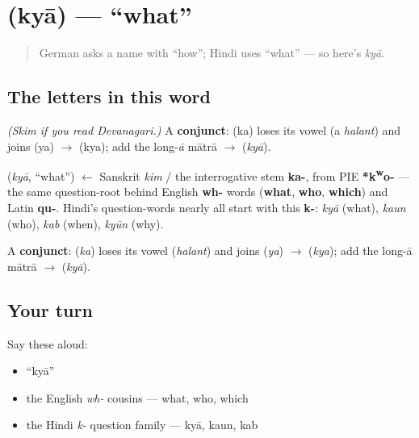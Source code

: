 \section[\texorpdfstring{\hi{क्या} (kyā)}{क्या (kyā)}]{ (kyā) — \textquotedblleft{}what\textquotedblright{}}

\label{lesson:HI-C02-kya}



\begin{quote}
German asks a name with \textquotedblleft{}how\textquotedblright{}; Hindi uses \textquotedblleft{}what\textquotedblright{} — so here's \emph{kyā}.
\end{quote}

\subsection*{The letters in this word}
\emph{(Skim if you read Devanagari.)} A \textbf{conjunct}: \textbf{} (ka) loses its vowel (a \emph{halant}) and joins \textbf{} (ya) $\to$ \textbf{} (kya); add the long-\emph{ā} mātrā $\to$ \textbf{} (\emph{kyā}).

\begin{cousinweb}
\textbf{} (\emph{kyā}, \textquotedblleft{}what\textquotedblright{}) $\leftarrow$ Sanskrit \emph{kim} / the interrogative stem \textbf{ka-}, from PIE \textbf{*k\textsuperscript{w}o-} — the same question-root behind English \textbf{wh-} words (\textbf{what}, \textbf{who}, \textbf{which}) and Latin \textbf{qu-}. Hindi's question-words nearly all start with this \textbf{k-}: \emph{kyā} (what), \emph{kaun} (who), \emph{kab} (when), \emph{kyūn} (why).
\end{cousinweb}

\begin{sounds}
A \textbf{conjunct}:  (\emph{ka}) loses its vowel (\emph{halant}) and joins  (\emph{ya}) $\to$  (\emph{kya}); add the long-ā mātrā $\to$  (\emph{kyā}).
\end{sounds}

\subsection*{Your turn}
Say these aloud:

\begin{itemize}
\raggedright
  \item \textquotedblleft{}kyā\textquotedblright{}
  \item the English \emph{wh-} cousins — what, who, which
  \item the Hindi \emph{k-} question family — kyā, kaun, kab
\end{itemize}

